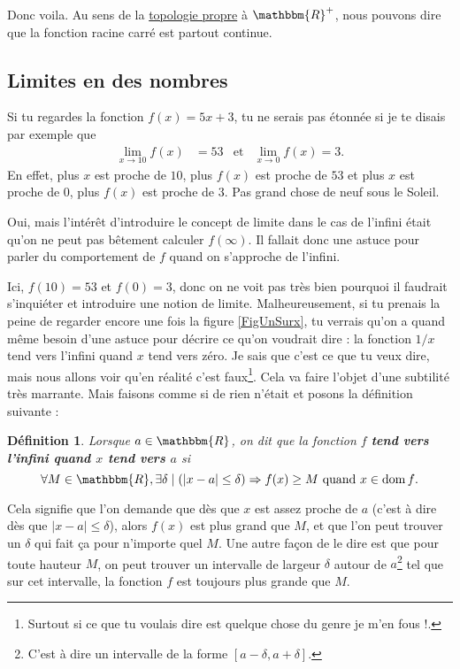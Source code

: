\documentclass[a4paper,12pt]{book}
\newcommand{\eR}{\mathbbm{R}}
\DeclareMathOperator{\dom}{dom}
\newcounter{numtho}
\theoremstyle{mes_exemples}	\newtheorem{exemple}[numtho]{Exemple}
\theoremstyle{mes_tho}
\newtheorem{definition}[numtho]{Définition}
\newcommand{\defe}[2]{\textbf{#1}\index{#2}}
\newcommand{\tq}{\mid}
\begin{document}
Donc voila. Au sens de la \href{http://fr.wikipedia.org/wiki/Topologie_induite}{topologie propre} à $\eR^+$, nous pouvons dire que la fonction racine carré est partout continue.
	\subsection{Limites en des nombres}

Si tu regardes la fonction $f(x)=5x+3$, tu ne serais pas étonnée si je te disais par exemple que 
\begin{align}
\lim_{x\to 10}f(x)&=53&\text{et}&\lim_{x\to 0}f(x)=3.
\end{align}
En effet, plus $x$ est proche de $10$, plus $f(x)$ est proche de $53$ et plus $x$ est proche de $0$, plus $f(x)$ est proche de $3$. Pas grand chose de neuf sous le Soleil.

 Oui, mais l'intérêt d'introduire le concept de limite dans le cas de l'infini était qu'on ne peut pas bêtement calculer $f(\infty)$. Il fallait donc une astuce pour parler du comportement de $f$ quand on s'approche de l'infini.

Ici, $f(10)=53$ et $f(0)=3$, donc on ne voit pas très bien pourquoi il faudrait s'inquiéter et introduire une notion de limite. Malheureusement, si tu prenais la peine de regarder encore une fois la figure \ref{FigUnSurx}, tu verrais qu'on a quand même besoin d'une astuce pour décrire ce qu'on voudrait dire  : la fonction $1/x$ tend vers l'infini quand $x$ tend vers zéro. Je sais que c'est ce que tu veux dire, mais nous allons voir qu'en réalité c'est faux\footnote{Surtout si ce que tu voulais dire est quelque chose du genre \og je m'en fous !\fg.}. Cela va faire l'objet d'une subtilité très marrante. Mais faisons comme si de rien n'était et posons la définition suivante :
\begin{definition}		\label{DefInfNombre}
Lorsque $a\in\eR$, on dit que la fonction $f$ \defe{tend vers l'infini quand $x$ tend vers $a$}{} si
\[ 
  \forall M\in\eR,\exists \delta\tq (| x-a |\leq \delta )\Rightarrow f(x)\geq M\text{ quand $x\in\dom f$}.
\]
\end{definition}
Cela signifie que l'on demande que dès que $x$ est assez proche de $a$ (c'est à dire dès que $| x-a |\leq\delta$), alors $f(x)$ est plus grand que $M$, et que l'on peut trouver un $\delta$ qui fait ça pour n'importe quel $M$. Une autre façon de le dire est que pour toute hauteur $M$, on peut trouver un intervalle de largeur $\delta$ autour de $a$\footnote{C'est à dire un intervalle de la forme $[a-\delta,a+\delta]$.} tel que sur cet intervalle, la fonction $f$ est toujours plus grande que $M$.
\end{document}
